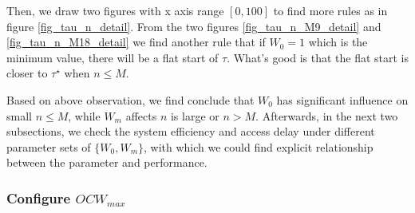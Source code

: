 \documentclass[journal]{IEEEtran}
\begin{document}
Then, we draw two figures with x axis range $[0,100]$ to find more rules as in figure \ref{fig_tau_n_detail}. 
From the two figures \ref{fig_tau_n_M9_detail} and \ref{fig_tau_n_M18_detail} we find another rule that if $W_0=1$ which is the minimum value, there will be a flat start of $\tau$.
What's good is that the flat start is closer to $\tau^\star$ when $n\leq M$.

Based on above observation, we find conclude that $W_0$ has significant influence on small $n\leq M$, while $W_m$ affects $n$ is large or $n>M$. 
Afterwards, in the next two subsections, we check the system efficiency and access delay under different parameter sets of $\lbrace W_0, W_m \rbrace$, with which we could find explicit relationship between the parameter and performance.




\subsubsection{Configure $OCW_{max}$}
\end{document}
